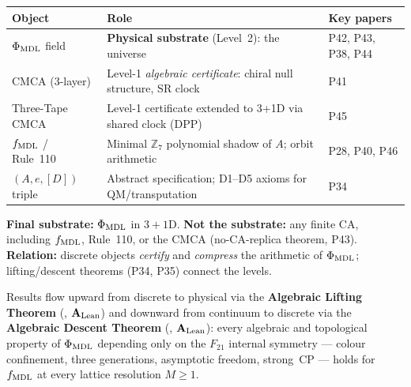 \begin{tcolorbox}[colback=green!3,colframe=green!50!black,
  title={\textbf{How the substrates and CA models relate}},
  fonttitle=\bfseries,left=6pt,right=6pt,top=5pt,bottom=5pt]
\small
\begin{center}
\begin{tabular}{@{}p{}p{}p{}@{}}
\toprule
\textbf{Object} & \textbf{Role} & \textbf{Key papers} \\
\midrule
$\Phi_{\rm MDL}$ field &
  \textbf{Physical substrate} (Level~2): the universe &
  P42, P43, P38, P44 \\
CMCA (3-layer) &
  Level-1 \emph{algebraic certificate}: chiral null structure, SR clock &
  P41 \\
Three-Tape CMCA &
  Level-1 certificate extended to 3+1D via shared clock (DPP) &
  P45 \\
$f_{\rm MDL}$ / Rule~110 &
  Minimal $\mathbb{Z}_7$ polynomial shadow of $A$; orbit arithmetic &
  P28, P40, P46 \\
$(A,e,[D])$ triple &
  Abstract specification; D1--D5 axioms for QM/transputation &
  P34 \\
\bottomrule
\end{tabular}
\end{center}
\noindent\textbf{Final substrate:} $\Phi_{\rm MDL}$ in $3{+}1$D.  \textbf{Not the
substrate:} any finite CA, including $f_{\rm MDL}$, Rule~110, or the CMCA
(no-CA-replica theorem, P43).  \textbf{Relation:} discrete objects \emph{certify}
and \emph{compress} the arithmetic of $\Phi_{\rm MDL}$; lifting/descent theorems
(P34, P35) connect the levels.
\end{tcolorbox}

Results flow upward from discrete to physical via the \textbf{Algebraic Lifting
Theorem} (, $\mathbf{A}_{\rm Lean}$) and downward
from continuum to discrete via the \textbf{Algebraic Descent Theorem}
(, $\mathbf{A}_{\rm Lean}$): every algebraic and
topological property of $\Phi_{\rm MDL}$ depending only on the $F_{21}$ internal
symmetry --- colour confinement, three generations, asymptotic freedom, strong~CP
--- holds for $f_{\rm MDL}$ at every lattice resolution $M \geq 1$.

